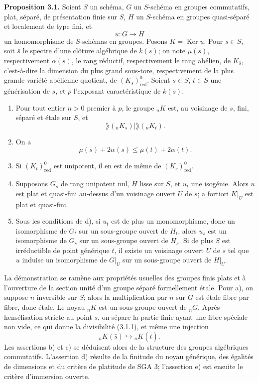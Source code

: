 \documentclass[11pt]{article}
\providecommand{\Ker}{\operatorname{Ker}}
\begin{document}
\textbf{Proposition 3.1.} Soient \(S\) un schéma, \(G\) un \(S\)-schéma en groupes commutatifs, plat, séparé, de présentation finie sur \(S\), \(H\) un \(S\)-schéma en groupes quasi-séparé et localement de type fini, et
\[
        u:G\longrightarrow H
\]
un homomorphisme de \(S\)-schémas en groupes.  Posons \(K=\Ker u\).  Pour \(s\in S\), soit \(\bar s\) le spectre d'une clôture algébrique de \(k(s)\); on note \(\mu(s)\), respectivement \(\alpha(s)\), le rang réductif, respectivement le rang abélien, de \(K_{\bar s}\), c'est-à-dire la dimension du plus grand sous-tore, respectivement de la plus grande variété abélienne quotient, de \((K_{\bar s})^0_{\mathrm{red}}\).  Soient \(s\in S\), \(t\in S\) une générisation de \(s\), et \(p\) l'exposant caractéristique de \(k(s)\).

\begin{enumerate}[label=\alph*)]
\item Pour tout entier \(n>0\) premier à \(p\), le groupe \({}_nK\) est, au voisinage de \(s\), fini, séparé et étale sur \(S\), et
\begin{equation}\tag{3.1.1}
        \rang({}_nK_s)\mid \rang({}_nK_t).
\end{equation}
\item On a
\begin{equation}\tag{3.1.2}
        \mu(s)+2\alpha(s)\leq \mu(t)+2\alpha(t).
\end{equation}
\item Si \((K_t)^0_{\mathrm{red}}\) est unipotent, il en est de même de \((K_s)^0_{\mathrm{red}}\).
\item Supposons \(G_s\) de rang unipotent nul, \(H\) lisse sur \(S\), et \(u_t\) une isogénie.  Alors \(u\) est plat et quasi-fini au-dessus d'un voisinage ouvert \(U\) de \(s\); a fortiori \(K|_U\) est plat et quasi-fini.
\item Sous les conditions de d), si \(u_t\) est de plus un monomorphisme, donc un isomorphisme de \(G_t\) sur un sous-groupe ouvert de \(H_t\), alors \(u_s\) est un isomorphisme de \(G_s\) sur un sous-groupe ouvert de \(H_s\).  Si de plus \(S\) est irréductible de point générique \(t\), il existe un voisinage ouvert \(U\) de \(s\) tel que \(u\) induise un isomorphisme de \(G|_U\) sur un sous-groupe ouvert de \(H|_U\).
\end{enumerate}

La démonstration se ramène aux propriétés usuelles des groupes finis plats et à l'ouverture de la section unité d'un groupe séparé formellement étale.  Pour a), on suppose \(n\) inversible sur \(S\); alors la multiplication par \(n\) sur \(G\) est étale fibre par fibre, donc étale.  Le noyau \({}_nK\) est un sous-groupe ouvert de \({}_nG\).  Après hensélisation stricte au point \(s\), on sépare la partie finie ayant une fibre spéciale non vide, ce qui donne la divisibilité (3.1.1), et même une injection
\[
        {}_nK(\bar s)\hookrightarrow {}_nK(\bar t).
\]
Les assertions b) et c) se déduisent alors de la structure des groupes algébriques commutatifs.  L'assertion d) résulte de la finitude du noyau générique, des égalités de dimensions et du critère de platitude de SGA 3; l'assertion e) est ensuite le critère d'immersion ouverte.
\end{document}
